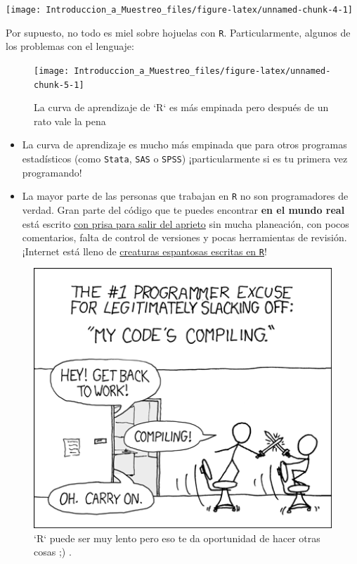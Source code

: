 \documentclass[
]{book}
\begin{document}
\begin{center}\texttt{[image: Introduccion\_a\_Muestreo\_files/figure-latex/unnamed-chunk-4-1]} \end{center}

Por supuesto, no todo es miel sobre hojuelas con \texttt{R}. Particularmente, algunos de los problemas con el lenguaje:

\begin{figure}

{\centering \texttt{[image: Introduccion\_a\_Muestreo\_files/figure-latex/unnamed-chunk-5-1]} 

}

\caption{La curva de aprendizaje de `R` es más empinada pero después de un rato vale la pena}\label{fig:unnamed-chunk-5}
\end{figure}

\begin{itemize}
\item
  La curva de aprendizaje es mucho más empinada que para otros programas estadísticos (como \texttt{Stata}, \texttt{SAS} o \texttt{SPSS}) ¡particularmente si es tu primera vez programando!
\item
  La mayor parte de las personas que trabajan en \texttt{R} no son programadores de verdad. Gran parte del código que te puedes encontrar \textbf{en el mundo real} está escrito \href{https://nsaunders.wordpress.com/2014/05/14/this-is-why-code-written-by-scientists-gets-ugly/}{con prisa para salir del aprieto} sin mucha planeación, con pocos comentarios, falta de control de versiones y pocas herramientas de revisión. ¡Internet está lleno de \href{https://codegolf.stackexchange.com/a/4011}{creaturas espantosas escritas en \texttt{R}}!
\end{itemize}

\begin{figure}

{\centering \includegraphics[width=5.74in]{images/compiling} 

}

\caption{`R` puede ser muy lento pero eso te da oportunidad de hacer otras cosas ;) .}\label{fig:unnamed-chunk-6}
\end{figure}
\end{document}
